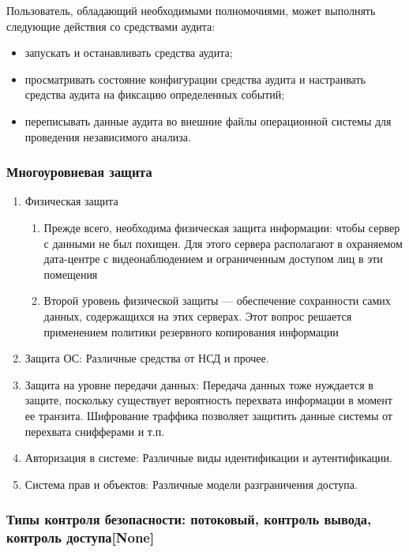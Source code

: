 Пользователь, обладающий необходимыми полномочиями, может выполнять следующие действия со средствами аудита:
\begin{itemize}
	\item запускать и останавливать средства аудита;
	\item просматривать состояние конфигурации средства аудита и настраивать средства аудита на фиксацию определенных событий;
	\item переписывать данные аудита во внешние файлы операционной системы для проведения независимого анализа.
\end{itemize}

\subsubsection{Многоуровневая защита}
\begin{enumerate}
	\item Физическая защита
	\begin{enumerate}
		\item Прежде всего, необходима физическая защита информации: чтобы сервер с данными не был похищен. Для этого сервера располагают в охраняемом дата-центре с видеонаблюдением и ограниченным доступом лиц в эти помещения
		\item Второй уровень физической защиты — обеспечение сохранности самих данных, содержащихся на этих серверах. Этот вопрос решается применением политики резервного копирования информации
	\end{enumerate}
	\item Защита ОС: Различные средства от НСД и прочее.
	
	\item Защита на уровне передачи данных: Передача данных тоже нуждается в защите, поскольку существует вероятность перехвата информации в момент ее транзита. Шифрование траффика позволяет защитить данные системы от перехвата снифферами и т.п.
	
	\item Авторизация в системе: Различные виды идентификации и аутентификации.
	
	\item Система прав и объектов: Различные модели разграничения доступа.
\end{enumerate}

\subsubsection{Типы контроля безопасности: потоковый, контроль вывода, контроль доступа[None]}